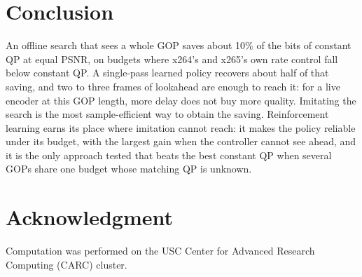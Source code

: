 \documentclass[conference]{IEEEtran}
\begin{document}
\section{Conclusion}
An offline search that sees a whole GOP saves about 10\% of the bits of constant QP at equal PSNR, on budgets where x264's and x265's own rate control fall below constant QP. A single-pass learned policy recovers about half of that saving, and two to three frames of lookahead are enough to reach it: for a live encoder at this GOP length, more delay does not buy more quality. Imitating the search is the most sample-efficient way to obtain the saving. Reinforcement learning earns its place where imitation cannot reach: it makes the policy reliable under its budget, with the largest gain when the controller cannot see ahead, and it is the only approach tested that beats the best constant QP when several GOPs share one budget whose matching QP is unknown.

\section*{Acknowledgment}
Computation was performed on the USC Center for Advanced Research Computing (CARC) cluster.
\end{document}
